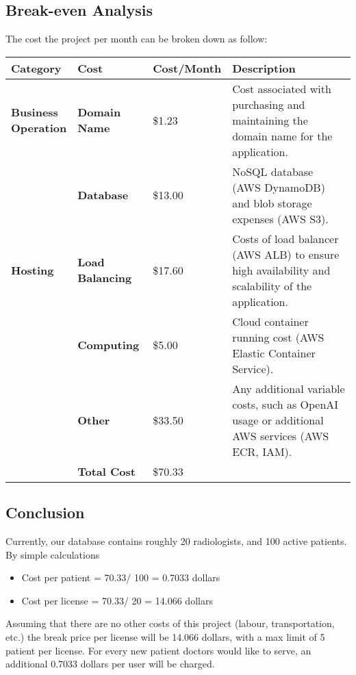 \documentclass{article}
\begin{document}
\subsection{Break-even Analysis}
The cost the project per month can be broken down as follow:
\begin{longtable}{| p{} | p{} | p{} | p{}|}
    \hline
    \textbf{Category} & \textbf{Cost} & \textbf{Cost/Month} & \textbf{Description} \\
    \hline

    \multirow{1}{*}{\parbox{0.15\textwidth}{\textbf{Business\\Operation}}}
    & \textbf{Domain Name} & \$1.23 & Cost associated with purchasing and maintaining the domain name for the application. \\
    \hline 

    \multirow{3}{*}{\textbf{Hosting}} 
    & \textbf{Database} & \$13.00 & NoSQL database (AWS DynamoDB) and blob storage expenses (AWS S3). \\
    \cline{2-4}
    & \textbf{Load Balancing} & \$17.60 & Costs of load balancer (AWS ALB) to ensure high availability and scalability of the application. \\
    \cline{2-4}
    & \textbf{Computing} & \$5.00 & Cloud container running cost (AWS Elastic Container Service). \\
    \cline{2-4}
    & \textbf{Other} & \$33.50 & Any additional variable costs, such as OpenAI usage or additional AWS services (AWS ECR, IAM). \\ 
    \hline
    
    & \textbf{Total Cost} & \$70.33 & \\
    \hline
\end{longtable}

\newpage
\subsection{Conclusion}
Currently, our database contains roughly 20 radiologists, and 100 active patients. By simple calculations
\begin{itemize}
    \item Cost per patient = 70.33/ 100 = 0.7033 dollars
    \item Cost per license = 70.33/ 20 = 14.066 dollars
\end{itemize}
Assuming that there are no other costs of this project (labour, transportation, etc.) the break price per license will be 14.066 dollars, with a max limit of 5 patient per license. For every new patient doctors would like to serve, an additional 0.7033 dollars per user will be charged.
\end{document}
